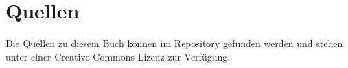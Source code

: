%
%
%
\section{Quellen}
%
Die Quellen zu diesem Buch können im Repository
\cite{buch:repo} gefunden werden und stehen unter einer Creative Commons
Lizenz zur Verfügung.


